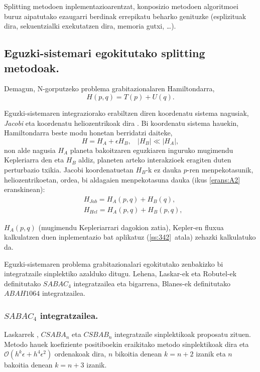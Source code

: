 Splitting metodoen inplementazioarentzat, konposizio metodoen algoritmoei buruz aipatutako ezaugarri berdinak errepikatu beharko genituzke (esplizituak dira, sekuentzialki exekutatzen dira, memoria gutxi, \dots). 

\subsection{Eguzki-sistemari egokitutako splitting metodoak.}

Demagun, N-gorputzeko problema grabitazionalaren Hamiltondarra,
\begin{equation*}
H(p,q)=T(p)+U(q).
\end{equation*}

Eguzki-sistemaren integraziorako erabiltzen diren koordenatu sistema nagusiak, \emph{Jacobi} eta koordenatu heliozentrikoak dira \cite{Wisdom2006,Farres2013}.  Bi koordenatu sistema hauekin, Hamiltondarra beste modu honetan berridatzi daiteke,
\begin{equation*}
H=H_A+\epsilon H_B,  \ \ \ \ |H_B|\ll|H_A|,
\end{equation*}
non alde nagusia $H_A$ planeta bakoitzaren eguzkiaren inguruko mugimendu Kepleriarra den eta $H_B$ aldiz, planeten arteko interakzioek eragiten duten perturbazio txikia. Jacobi koordenatuetan $H_B$-k ez dauka $p$-ren menpekotasunik, heliozentrikoetan, ordea, bi aldagaien menpekotasuna dauka (ikus \ref{erans:A2} eranskinean):
\begin{align*}
&H_{Jab}=H_A(p,q)+H_B(q), \\
&H_{Hel}=H_A(p,q)+H_B(p,q), 
\end{align*}       

$H_A(p,q)$ (mugimendu Kepleriarrari dagokion zatia), Kepler-en fluxua kalkulatzen duen inplementazio bat aplikatuz (\ref{ss:342}~atala) zehazki kalkulatuko da.

Eguzki-sistemaren problema grabitazionalari egokitutako zenbakizko bi integratzaile sinplektiko azalduko ditugu. Lehena, Laskar-ek eta Robutel-ek \cite{Laskar2001} definitutako \emph{$SABAC_4$} integratzailea eta bigarrena, Blanes-ek \cite{Blanes2013,Farres2013} definitutako \emph{$ABAH1064$} integratzailea. 


\subsubsection*{$SABAC_4$ integratzailea.}

Laskarrek \cite[$2001$]{Laskar2001}, $CSABA_n$ eta $CSBAB_n$ integratzaile sinplektikoak proposatu zituen. Metodo hauek koefiziente positiboekin eraikitako metodo sinplektikoak dira eta $\mathcal{O}(h^{k} \epsilon+ h^{4} \epsilon^2)$ ordenakoak dira, $n$ bikoitia denean $k=n+2$ izanik eta $n$ bakoitia denean $k=n+3$ izanik. 

